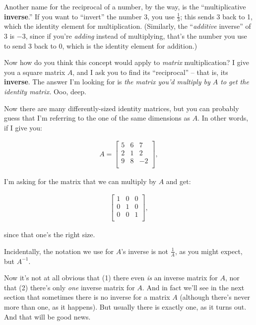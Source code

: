 Another name for the reciprocal of a number, by the way, is the
``multiplicative \textbf{inverse}.'' If you want to ``invert'' the number $3$,
you use $\frac{1}{3}$; this sends $3$ back to 1, which the identity element for
multiplication. (Similarly, the ``\textit{additive} inverse'' of $3$ is $-3$,
since if you're \textit{adding} instead of multiplying, that's the number you
use to send $3$ back to 0, which is the identity element for addition.)

\smallskip

Now how do you think this concept would apply to \textit{matrix}
multiplication? I give you a square matrix $A$, and I ask you to find its
``reciprocal'' -- that is, its \textbf{inverse}. The answer I'm looking for is
\textit{the matrix you'd multiply by $A$ to get the identity matrix.} Ooo,
deep.

Now there are many differently-sized identity matrices, but you can probably
guess that I'm referring to the one of the same dimensions as $A$. In other
words, if I give you:

\vspace{-.15in}
\begin{align*}
A = 
\begin{bmatrix}
5 & 6 & 7 \\
2 & 1 & 2 \\
9 & 8 & -2 \\
\end{bmatrix},
\end{align*}
\vspace{-.15in}

I'm asking for the matrix that we can multiply by $A$ and get:

\vspace{-.15in}
\begin{align*}
\begin{bmatrix}
1 & 0 & 0 \\
0 & 1 & 0 \\
0 & 0 & 1 \\
\end{bmatrix},
\end{align*}
\vspace{-.15in}

since that one's the right size.

\smallskip
Incidentally, the notation we use for $A$'s inverse is not $\frac{1}{A}$, as
you might expect, but $A^{-1}$.
\smallskip

Now it's not at all obvious that (1) there even \textit{is} an inverse matrix
for $A$, nor that (2) there's only \textit{one} inverse matrix for $A$. And in
fact we'll see in the next section that sometimes there is no inverse for a
matrix $A$ (although there's never more than one, as it happens). But usually
there is exactly one, as it turns out. And that will be good news.

